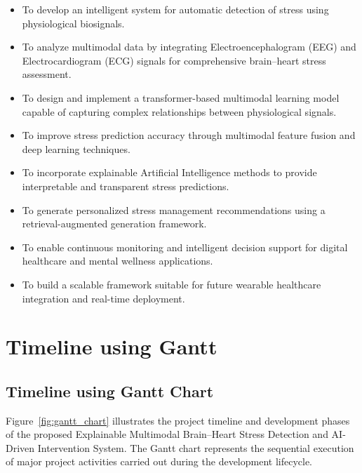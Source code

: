 \documentclass[12pt,a4paper]{report}
\begin{document}
\begin{itemize}
\item To develop an intelligent system for automatic detection of stress using physiological biosignals.

\item To analyze multimodal data by integrating Electroencephalogram (EEG) and Electrocardiogram (ECG) signals for comprehensive brain–heart stress assessment.

\item To design and implement a transformer-based multimodal learning model capable of capturing complex relationships between physiological signals.

\item To improve stress prediction accuracy through multimodal feature fusion and deep learning techniques.

\item To incorporate explainable Artificial Intelligence methods to provide interpretable and transparent stress predictions.

\item To generate personalized stress management recommendations using a retrieval-augmented generation framework.

\item To enable continuous monitoring and intelligent decision support for digital healthcare and mental wellness applications.

\item To build a scalable framework suitable for future wearable healthcare integration and real-time deployment.

\end{itemize}

\chapter{Timeline using Gantt }

\section{Timeline using Gantt Chart}

Figure~\ref{fig:gantt_chart} illustrates the project timeline and development phases of the proposed Explainable Multimodal Brain--Heart Stress Detection and AI-Driven Intervention System. The Gantt chart represents the sequential execution of major project activities carried out during the development lifecycle.
\end{document}
